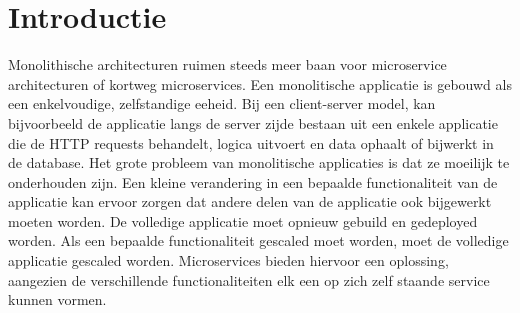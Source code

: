 \documentclass[fleqn,10pt]{voorstel}
\affiliation{\textbf{Contact:}
  \textsuperscript{1} \href{mailto:frederic.everaert.u1028@student.hogent.be}{frederic.everaert.u1028@student.hogent.be};
  \textsuperscript{2} \href{mailto:geert.vandensteen@synthetron.com}{geert.vandensteen@synthetron.com}}
\begin{document}
\flushbottom %
\maketitle %
\tableofcontents %
\thispagestyle{empty} %



\section{Introductie} %
\label{sec:introductie}
%
%
%

Monolithische architecturen ruimen steeds meer baan voor microservice architecturen of kortweg microservices. Een monolitische applicatie is gebouwd als een enkelvoudige, zelfstandige eeheid. Bij een client-server model, kan bijvoorbeeld de applicatie langs de server zijde bestaan uit een enkele applicatie die de HTTP requests behandelt, logica uitvoert en data ophaalt of bijwerkt in de database. Het grote probleem van monolitische applicaties is dat ze moeilijk te onderhouden zijn. Een kleine verandering in een bepaalde functionaliteit van de applicatie kan ervoor zorgen dat andere delen van de applicatie ook bijgewerkt moeten worden. De volledige applicatie moet opnieuw gebuild en gedeployed worden. Als een bepaalde functionaliteit gescaled moet worden, moet de volledige applicatie gescaled worden. Microservices bieden hiervoor een oplossing, aangezien de verschillende functionaliteiten elk een op zich zelf staande service kunnen vormen. \\
\end{document}
